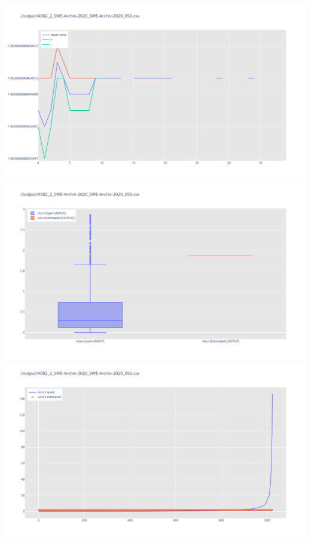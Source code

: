 \includegraphics[width=\textwidth]{Scripts/output/A002_2_SWE-Archiv-2020_SWE-Archiv-2020_050.csv.error_distribution.png}
\includegraphics[width=\textwidth]{Scripts/output/A002_2_SWE-Archiv-2020_SWE-Archiv-2020_050.csv.png}
\includegraphics[width=\textwidth]{Scripts/output/A002_2_SWE-Archiv-2020_SWE-Archiv-2020_050.csv.scatter.png}
